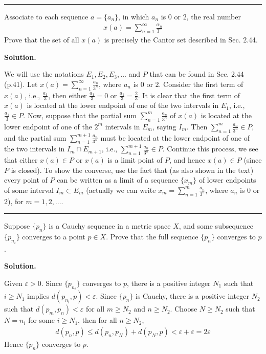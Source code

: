 \documentclass[12pt]{article}
\theoremstyle{definition}
\begin{document}
\bigskip\noindent\hrule\bigskip

Associate to each sequence $a=\{a_n\}$, in which $a_n$ is $0$ or $2$, the real number
\begin{align*}
x(a)=\sum_{n=1}^\infty\frac{\alpha_n}{3^n}
\end{align*}
Prove that the set of all $x(a)$ is precisely the Cantor set described in Sec. 2.44.

\smallskip
\noindent\textbf{Solution.}\quad

We will use the notations $E_1,E_2,E_3,\ldots$ and $P$ that can be found in Sec. 2.44 (p.41). Let $x(a)=\sum_{n=1}^\infty\frac{a_n}{3^n}$, where $a_n$ is $0$ or $2$. Consider the first term of $x(a)$, i.e., $\frac{a_1}{3}$, then either $\frac{a_1}{3}=0$ or $\frac{a_1}{3}=\frac{2}{3}$. It is clear that the first term of $x(a)$ is located at the lower endpoint of one of the two intervals in $E_1$, i.e., $\frac{a_1}{3}\in P$. Now, suppose that the partial sum $\sum_{n=1}^m\frac{a_n}{3^n}$ of $x(a)$ is located at the lower endpoint of one of the $2^m$ intervals in $E_m$, saying $I_m$. Then $\sum_{n=1}^m\frac{a_n}{3^n}\in P$, and the partial sum $\sum_{n=1}^{m+1}\frac{a_n}{3^n}$ must be located at the lower endpoint of one of the two intervals in $I_m\cap E_{m+1}$, i.e., $\sum_{n=1}^{m+1}\frac{a_n}{3^n}\in P$. Continue this process, we see that either $x(a)\in P$ or $x(a)$ is a limit point of $P$, and hence $x(a)\in P$ (since $P$ is closed). To show the converse, use the fact that (as also shown in the text) every point of $P$ can be written as a limit of a sequence $\{x_m\}$ of lower endpoints of some interval $I_m\subset E_m$ (actually we can write $x_m=\sum_{n=1}^m\frac{a_n}{3^n}$, where $a_n$ is $0$ or $2$), for $m=1,2,\ldots$.



\bigskip\noindent\hrule\bigskip

Suppose $\{p_n\}$ is a Cauchy sequence in a metric space $X$, and some subsequence $\{p_{n_i}\}$ converges to a point $p\in X$. Prove that the full sequence $\{p_n\}$ converges to $p$.

\smallskip
\noindent\textbf{Solution.}\quad

Given $\varepsilon>0$. Since $\{p_{n_i}\}$ converges to $p$, there is a positive integer $N_1$ such that $i\ge N_1$ implies $d(p_{n_i},p)<\varepsilon$. Since $\{p_n\}$ is Cauchy, there is a positive integer $N_2$ such that $d(p_m,p_n)<\varepsilon$ for all $m\ge N_2$ and $n\ge N_2$. Choose $N\ge N_2$ such that $N=n_i$ for some $i\ge N_1$, then for all $n\ge N_2$,
\begin{align*}
d(p_n,p)
\le d(p_n,p_N)+d(p_N,p)
<\varepsilon+\varepsilon
=2\varepsilon
\end{align*}
Hence $\{p_n\}$ converges to $p$.
\end{document}
